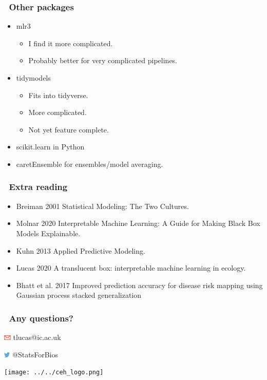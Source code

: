 \documentclass[handout, aspectratio = 169]{beamer}
\begin{document}
\begin{frame}
\frametitle{\insertframenumber~Other packages}

\begin{itemize}
\item mlr3
	\begin{itemize}
	\item I find it more complicated. 
	\item Probably better for very complicated pipelines.
	\end{itemize}
\item tidymodels
	\begin{itemize}
	\item Fits into tidyverse.
	\item More complicated.
	\item Not yet feature complete.
	\end{itemize}
\item scikit.learn in Python
\item caretEnsemble for ensembles/model averaging.
\end{itemize}
\end{frame} 




\begin{frame}
\frametitle{\insertframenumber~Extra reading}

\begin{itemize}
\item Breiman 2001 Statistical Modeling: The Two Cultures.
\item Molnar 2020 Interpretable Machine Learning: A Guide for Making Black Box Models Explainable.
\item Kuhn 2013 Applied Predictive Modeling.
\item Lucas 2020 A translucent box: interpretable machine learning in ecology.
\item Bhatt et al. 2017 Improved prediction accuracy for disease risk mapping using Gaussian process stacked generalization
\end{itemize}
\end{frame} 




\begin{frame}

\frametitle{\insertframenumber~Any questions?}

\vspace{5mm}


\vspace{4mm}

\includegraphics[height=7pt]{Ar_Icon_Contact.pdf} tlucas{\footnotesize{@}}ic.ac.uk

\includegraphics[height=7pt]{Twitter_logo_blue-small.png} {\footnotesize{@}}StatsForBios

\vspace{2cm}
\hfill %
\texttt{[image: ../../ceh\_logo.png]}

\end{frame}




 
 
\end{document}
